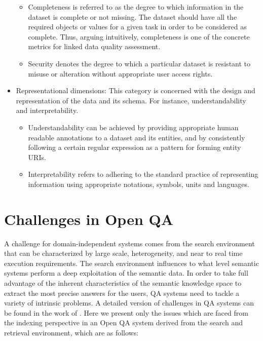 \documentclass{article}
\begin{document}
\begin{itemize}
\begin{itemize}
\item Completeness is referred to as the degree to which information in the dataset is complete or not missing. The dataset should have all the required objects or values for a given task in order to be considered as complete. Thus, arguing intuitively, completeness is one of the concrete metrics for linked data quality assessment. 
\item Security denotes the degree to which a particular dataset is resistant to misuse or alteration without appropriate user access rights. 
\end{itemize}
\item Representational dimensions: This category is concerned with the design and representation of the data and its schema. For instance, understandability and interpretability.
\begin{itemize}
\item Understandability can be achieved by providing appropriate human readable annotations to a dataset and its entities, and by consistently following a certain regular expression as a pattern for forming entity URIs.
\item Interpretability refers to adhering to the standard practice of representing information using appropriate notations, symbols, units and languages. 
\end{itemize}
\end{itemize}

\section{Challenges in Open QA}
\label{chal}

A challenge for domain-independent systems comes from the search environment that can be characterized by large scale, heterogeneity, and near to real time execution requirements. The search environment influences to what level semantic systems perform a deep exploitation of the semantic data. In order to take full advantage of the inherent characteristics of the semantic knowledge space to extract the most precise answers for the users, QA systems need to tackle a variety of intrinsic problems. A detailed version of challenges in QA systems can be found in the work of \cite{lopez2011question, kolomiyets2011survey}. Here we present only the issues which are faced from the indexing perspective in an Open QA system derived from the search and retrieval environment, which are as follows:
\end{document}
